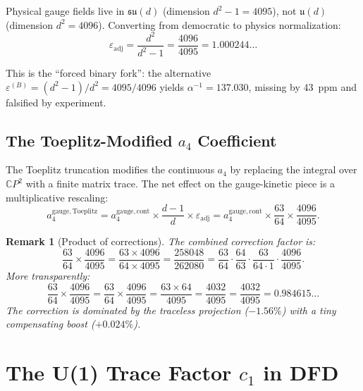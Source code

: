 \documentclass[12pt,a4paper]{article}
\newtheorem{remark}[theorem]{Remark}
\begin{document}
Physical gauge fields live in $\mathfrak{su}(d)$ (dimension $d^2 - 1 = 4095$),
not $\mathfrak{u}(d)$ (dimension $d^2 = 4096$).  Converting from democratic
to physics normalization:
\begin{equation}\label{eq:boost}
\boxed{
\varepsilon_{\mathrm{adj}} = \frac{d^2}{d^2 - 1}
= \frac{4096}{4095} = 1.000244\ldots
}
\end{equation}

This is the ``forced binary fork'': the alternative
$\varepsilon^{(B)} = (d^2-1)/d^2 = 4095/4096$ yields $\alpha^{-1} = 137.030$,
missing by 43~ppm and falsified by experiment.

\subsection{The Toeplitz-Modified $a_4$ Coefficient}

The Toeplitz truncation modifies the continuous $a_4$ by replacing
the integral over $\mathbb{C}P^2$ with a finite matrix trace.  The
net effect on the gauge-kinetic piece is a multiplicative rescaling:
\begin{equation}\label{eq:a4-toeplitz}
a_4^{\mathrm{gauge, Toeplitz}} = a_4^{\mathrm{gauge, cont}}
\times \frac{d-1}{d} \times \varepsilon_{\mathrm{adj}}
= a_4^{\mathrm{gauge, cont}} \times \frac{63}{64} \times \frac{4096}{4095}.
\end{equation}

\begin{remark}[Product of corrections]
The combined correction factor is:
\begin{equation}
\frac{63}{64} \times \frac{4096}{4095}
= \frac{63 \times 4096}{64 \times 4095}
= \frac{258048}{262080}
= \frac{63}{64} \cdot \frac{64}{63} \cdot \frac{63}{64 \cdot 1}
\cdot \frac{4096}{4095}.
\end{equation}
More transparently:
\begin{equation}
\frac{63}{64} \times \frac{4096}{4095}
= \frac{63}{64} \times \frac{4096}{4095}
= \frac{63 \times 64}{4095}
= \frac{4032}{4095}
= \frac{4032}{4095}
= 0.984615\ldots
\end{equation}
The correction is dominated by the traceless projection ($-1.56\%$) with a
tiny compensating boost ($+0.024\%$).
\end{remark}

\section{The U(1) Trace Factor $c_1$ in DFD}
\label{sec:c1-dfd}
\end{document}
